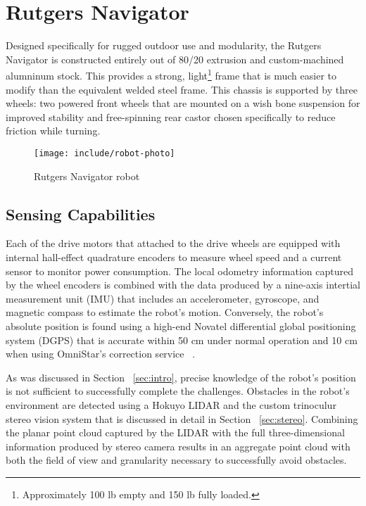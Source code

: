 \documentclass[11pt,twocolumn]{article}
\begin{document}
\section{Rutgers Navigator}
\label{sec:robot}
Designed specifically for rugged outdoor use and modularity, the Rutgers
Navigator is constructed entirely out of 80/20 extrusion and custom-machined
alumninum stock. This provides a strong, light\footnote{Approximately 100 lb
empty and 150 lb fully loaded.} frame that is much easier to modify than the
equivalent welded steel frame. This chassis is supported by three wheels: two
powered front wheels that are mounted on a wish bone suspension for improved
stability and free-spinning rear castor chosen specifically to reduce friction
while turning.

\begin{figure}
	\center
	\texttt{[image: include/robot-photo]}
	\caption{Rutgers Navigator robot}
	\label{fig:robot-photo}
\end{figure}

\subsection{Sensing Capabilities}
\label{sec:robot-sensors}
Each of the drive motors that attached to the drive wheels are equipped with
internal hall-effect quadrature encoders to measure wheel speed and a current
sensor to monitor power consumption. The local odometry information captured by
the wheel encoders is combined with the data produced by a nine-axis intertial
measurement unit (IMU) that includes an accelerometer, gyroscope, and magnetic
compass to estimate the robot's motion. Conversely, the robot's absolute
position is found using a high-end Novatel differential global positioning
system (DGPS) that is accurate within 50 cm under normal operation and 10 cm
when using OmniStar's correction service ~\cite{omnistar}.

As was discussed in Section ~\ref{sec:intro}, precise knowledge of the robot's
position is not sufficient to successfully complete the challenges. Obstacles
in the robot's environment are detected using a Hokuyo LIDAR and the custom
trinoculur stereo vision system that is discussed in detail in Section
~\ref{sec:stereo}. Combining the planar point cloud captured by the LIDAR with
the full three-dimensional information produced by stereo camera results in an
aggregate point cloud with both the field of view and granularity necessary to
successfully avoid obstacles.
\end{document}
